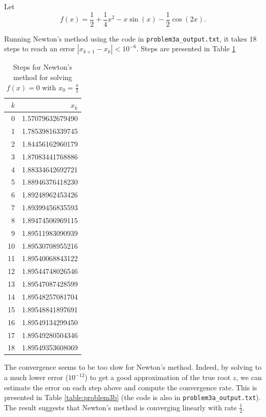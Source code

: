 \documentclass[newpage]{homework}
\begin{document}
\question 
Let 
\begin{equation*}
	f(x) = \frac{1}{2} + \frac{1}{4}x^2 - x\sin(x) - \frac{1}{2}\cos(2x).
\end{equation*}
\begin{alphaparts}
	\questionpart Running Newton's method using the code in \texttt{problem3a\_output.txt}, it takes 18 steps to reach an error $|x_{k+1} - x_k| < 10^{-6}$. Steps are presented in Table \ref{table:problem3a}
	\begin{table}[htb!]
		\centering
		\begin{tabular}{@{}rr@{}}
			\toprule
			$k$ & $x_k$ \\
			\midrule
			0 & 1.57079632679490\\
			1 & 1.78539816339745\\
			2 & 1.84456162960179\\
			3 & 1.87083441768886\\
			4 & 1.88334642692721\\
			5 & 1.88946376418230\\
			6 & 1.89248962453426\\
			7 & 1.89399456835593\\
			8 & 1.89474506969115\\
			9 & 1.89511983090939\\
			10 & 1.89530708955216\\
			11 & 1.89540068843122\\
			12 & 1.89544748026546\\
			13 & 1.89547087428599\\
			14 & 1.89548257081704\\
			15 & 1.89548841897691\\
			16 & 1.89549134299450\\
			17 & 1.89549280504346\\
			18 & 1.89549353608069 \\
			\bottomrule
		\end{tabular}
		\caption{Steps for Newton's method for solving $f(x) = 0$ with $x_0 = \frac{\pi}{2}$}
		\label{table:problem3a}
	\end{table}
	
	\questionpart The convergence seems to be too slow for Newton's method. Indeed, by solving to a much lower error ($10^{-12}$) to get a good approximation of the true root $z$, we can estimate the error on each step above and compute the convergence rate. This is presented in Table \ref{table:problem3b} (the code is also in \texttt{problem3a\_output.txt}). The result suggests that Newton's method is converging linearly with rate $\frac{1}{2}$. 
	

\end{alphaparts}
\end{document}
